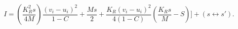 \begin{equation}
\label{itot}I=(\frac{K_R^2s}{4M})\frac{(v_i-u_i)^2}{1-C}+\frac{Ms}{2}+\frac{K_R(v_i-u_i)^2}{4(1-C)}(\frac{K_Rs}{M}-S)]+(s\leftrightarrow s').
\end{equation}

